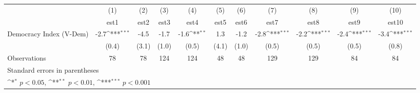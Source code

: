 {
\def\sym#1{\ifmmode^{#1}\else\(^{#1}\)\fi}
\begin{tabular}{l*{10}{c}}
\hline\hline
                    &\multicolumn{1}{c}{(1)}         &\multicolumn{1}{c}{(2)}         &\multicolumn{1}{c}{(3)}         &\multicolumn{1}{c}{(4)}         &\multicolumn{1}{c}{(5)}         &\multicolumn{1}{c}{(6)}         &\multicolumn{1}{c}{(7)}         &\multicolumn{1}{c}{(8)}         &\multicolumn{1}{c}{(9)}         &\multicolumn{1}{c}{(10)}         \\
                    &        est1         &        est2         &        est3         &        est4         &        est5         &        est6         &        est7         &        est8         &        est9         &       est10         \\
\hline
Democracy Index (V-Dem)&        -2.7\sym{***}&        -4.5         &        -1.7         &        -1.6\sym{**} &         1.3         &        -1.2         &        -2.8\sym{***}&        -2.2\sym{***}&        -2.4\sym{***}&        -3.4\sym{***}\\
                    &       (0.4)         &       (3.1)         &       (1.0)         &       (0.5)         &       (4.1)         &       (1.0)         &       (0.5)         &       (0.5)         &       (0.5)         &       (0.8)         \\
\hline
Observations        &          78         &          78         &         124         &         124         &          48         &          48         &         129         &         129         &          84         &          84         \\
\hline\hline
\multicolumn{11}{l}{\footnotesize Standard errors in parentheses}\\
\multicolumn{11}{l}{\footnotesize \sym{*} \(p<0.05\), \sym{**} \(p<0.01\), \sym{***} \(p<0.001\)}\\
\end{tabular}
}

